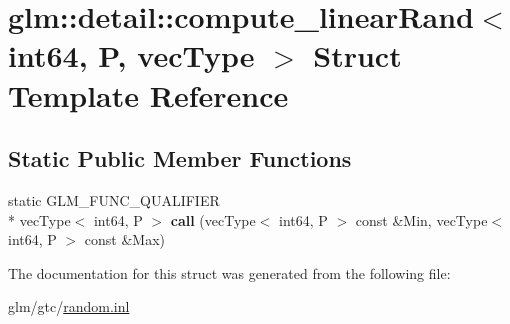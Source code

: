 \hypertarget{structglm_1_1detail_1_1compute__linearRand_3_01int64_00_01P_00_01vecType_01_4}{\section{glm\-:\-:detail\-:\-:compute\-\_\-linear\-Rand$<$ int64, P, vec\-Type $>$ Struct Template Reference}
\label{structglm_1_1detail_1_1compute__linearRand_3_01int64_00_01P_00_01vecType_01_4}
}
\subsection*{Static Public Member Functions}
\begin{DoxyCompactItemize}
\item 
\hypertarget{structglm_1_1detail_1_1compute__linearRand_3_01int64_00_01P_00_01vecType_01_4_ad6b4fdf74a9d37cfe638d062b82536ed}{static G\-L\-M\-\_\-\-F\-U\-N\-C\-\_\-\-Q\-U\-A\-L\-I\-F\-I\-E\-R \\*
vec\-Type$<$ int64, P $>$ {\bfseries call} (vec\-Type$<$ int64, P $>$ const \&Min, vec\-Type$<$ int64, P $>$ const \&Max)}\label{structglm_1_1detail_1_1compute__linearRand_3_01int64_00_01P_00_01vecType_01_4_ad6b4fdf74a9d37cfe638d062b82536ed}

\end{DoxyCompactItemize}


The documentation for this struct was generated from the following file\-:\begin{DoxyCompactItemize}
\item 
glm/gtc/\hyperlink{random_8inl}{random.\-inl}\end{DoxyCompactItemize}
